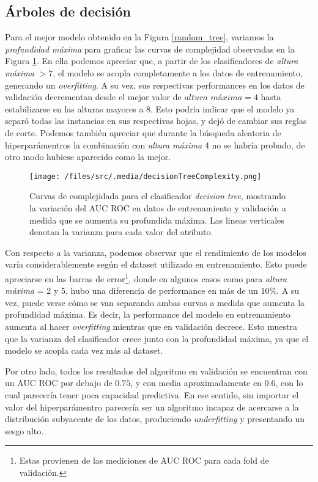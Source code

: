 \subsection{Árboles de decisión}
Para el mejor modelo obtenido en la Figura \ref{random_tree}, variamos la \textit{profundidad máxima} para graficar las curvas de complejidad observadas en la Figura \ref{decisionTreeComplexity}. En ella podemos apreciar que, a partir de los clasificadores de \textit{altura máxima} $> 7$, el modelo se acopla completamente a los datos de entrenamiento, generando un \textit{overfitting}. A su vez, sus respectivas performances en los datos de validación decrementan desde el mejor valor de $\textit{altura máxima} = 4$ hasta estabilizarse en las alturas mayores a 8. Esto podría indicar que el modelo ya separó todas las instancias en sus respectivas hojas, y dejó de cambiar sus reglas de corte. Podemos también apreciar que durante la búsqueda aleatoria de hiperparámentros la combinación con \textit{altura máxima} 4 no se habría probado, de otro modo hubiese aparecido como la mejor.  
\begin{figure}[!htbp]
    \centering
    \texttt{[image: /files/src/.media/decisionTreeComplexity.png]}
    \caption{Curvas de complejidada para el clasificador \textit{decision tree}, mostrando la variación del AUC ROC en datos de entrenamiento y validación a medida que se aumenta su profundida máxima. Las lineas verticales denotan la varianza para cada valor del atributo.}
    \label{decisionTreeComplexity}
\end{figure}

Con respecto a la varianza, podemos observar que el rendimiento de los modelos varía considerablemente según el dataset utilizado en entrenamiento. Esto puede apreciarse en las barras de error\footnote{Estas provienen de las mediciones de AUC ROC para cada fold de validación.}, donde en algunos casos como para \textit{altura máxima} = 2 y 5, hubo una diferencia de performance en más de un $10\%$. A su vez, puede verse cómo se van separando ambas curvas a medida que aumenta la profundidad máxima. Es decir, la performance del modelo en entrenamiento aumenta al hacer \textit{overfitting} mientras que en validación decrece. Esto muestra que la varianza del clasificador crece junto con la profundidad máxima, ya que el modelo se acopla cada vez más al dataset.

Por otro lado, todos los resultados del algoritmo en validación se encuentran con un AUC ROC por debajo de $0.75$, y con media aproximadamente en $0.6$, con lo cual parecería tener poca capacidad predictiva. En ese sentido, sin importar el valor del hiperparámentro parecería ser un algoritmo incapaz de acercarse a la distribución subyacente de los datos, produciendo \textit{underfitting} y presentando un sesgo alto.

